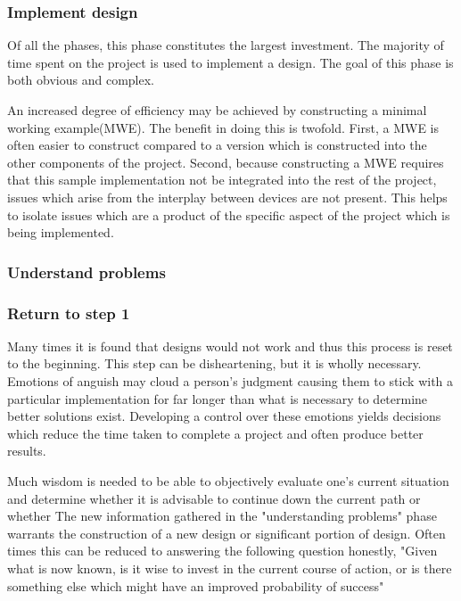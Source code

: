\documentclass{article}	%
\begin{document}
\begin{multicols}{2}

\subsubsection{Implement design}
Of all the phases, 
this phase constitutes the largest investment.
The majority of time spent on the project is
used to implement a design.
The goal of this phase is both obvious
and complex.

An increased degree of efficiency may be achieved by
constructing a minimal working example(MWE).
The benefit in doing this is twofold.
First, a MWE is often easier to construct compared to
a version which is constructed into the other
components of the project.
Second, because constructing a MWE requires that
this sample implementation not be integrated into
the rest of the project,
issues which arise from the interplay between devices are not present.
This helps to isolate issues which are a product
of the specific aspect of the project which is being implemented.


\subsubsection{Understand problems}

\subsubsection{Return to step 1}
Many times it is found that designs would not work
and thus this process is reset to the beginning.
This step can be disheartening, but
it is wholly necessary.
Emotions of anguish may cloud a person's judgment
causing them to stick with a particular implementation
for far longer than what is necessary to determine 
better solutions exist.
Developing a control over these emotions
yields decisions which reduce the time
taken to complete a project and
often produce better results.

Much wisdom is needed to be able to objectively 
evaluate one's current situation and determine 
whether it is advisable to
continue down the current path or whether
The new information gathered in the "understanding problems" phase
warrants the construction of a new design 
or significant portion of design.
Often times this can be reduced to answering the following question honestly,
"Given what is now known,
is it wise to invest in the current course of action, or
is there something else which might have an improved probability of success"


\end{multicols}
\end{document}
